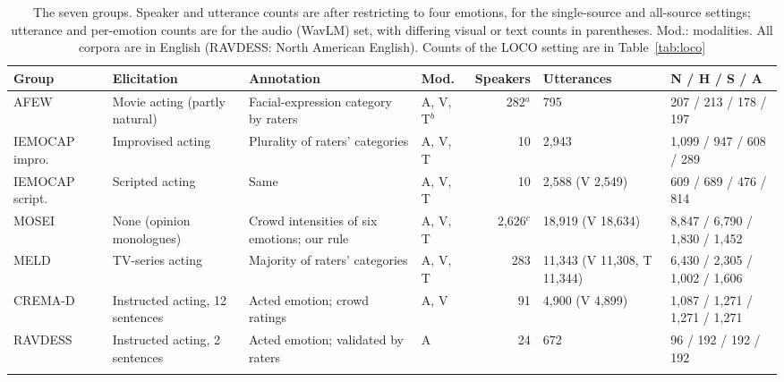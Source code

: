 \begin{table}[t]
\caption{The seven groups. Speaker and utterance counts are after restricting to four emotions, for the single-source and all-source settings; utterance and per-emotion counts are for the audio (WavLM) set, with differing visual or text counts in parentheses. Mod.: modalities. All corpora are in English (RAVDESS: North American English). Counts of the LOCO setting are in Table~\ref{tab:loco}}\label{tab:corpora}
\footnotesize\setlength{\tabcolsep}{3pt}
\begin{tabular}{@{}p{1.75cm}p{2.0cm}p{2.3cm}p{0.95cm}r p{1.75cm}p{1.9cm}@{}}
\toprule
Group & Elicitation & Annotation & Mod. & Speakers & Utterances & N / H / S / A \\
\midrule
AFEW \cite{dhall2012afew,dhall2013emotiw} & Movie acting (partly natural) & Facial-expression category by raters & A, V, T$^{b}$ & 282$^{a}$ & 795 & 207 / 213 / 178 / 197 \\
IEMOCAP impro.\ \cite{busso2008iemocap} & Improvised acting & Plurality of raters' categories & A, V, T & 10 & 2,943 & 1,099 / 947 / 608 / 289 \\
IEMOCAP script.\ \cite{busso2008iemocap} & Scripted acting & Same & A, V, T & 10 & 2,588 (V 2,549) & 609 / 689 / 476 / 814 \\
MOSEI \cite{zadeh2018mosei} & None (opinion monologues) & Crowd intensities of six emotions; our rule & A, V, T & 2,626$^{c}$ & 18,919 (V 18,634) & 8,847 / 6,790 / 1,830 / 1,452 \\
MELD \cite{poria2019meld} & TV-series acting & Majority of raters' categories & A, V, T & 283 & 11,343 (V 11,308, T 11,344) & 6,430 / 2,305 / 1,002 / 1,606 \\
CREMA-D \cite{cao2014cremad} & Instructed acting, 12 sentences & Acted emotion; crowd ratings & A, V & 91 & 4,900 (V 4,899) & 1,087 / 1,271 / 1,271 / 1,271 \\
RAVDESS \cite{livingstone2018ravdess} & Instructed acting, 2 sentences & Acted emotion; validated by raters & A & 24 & 672 & 96 / 192 / 192 / 192 \\
\botrule
\end{tabular}
\end{table}

